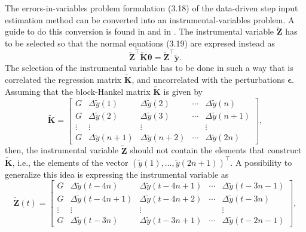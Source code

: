 \documentclass[11pt]{article}
\begin{document}
\begin{itemize}
\begin{itemize}
    The errors-in-variables problem formulation (3.18) of the data-driven step input estimation method can be converted into an instrumental-variables problem.
    A guide to do this conversion is found in \cite{Soderstrom18} and in \cite{Pintelon12Book}. 
    The instrumental variable $\widetilde{\mathbf{Z}}$ has to be selected so that the normal equations (3.19) are expresed instead as
    \begin{equation} \tag{4.22} \widetilde{\mathbf{Z}}^\top \widetilde{\mathbf{K}} \bm{\theta} = \widetilde{\mathbf{Z}}^\top \widetilde{\mathbf{y}} . \label{eqn:neq_siv} \end{equation}
    The selection of the instrumental variable has to be done in such a way that is correlated the regression matrix $\widetilde{\mathbf{K}}$, and uncorrelated with the perturbations $\bm{\epsilon}$.
    Assuming that the block-Hankel matrix $\widetilde{\mathbf{K}}$ is given by
    \begin{equation} \tag{4.23} \widetilde{\mathbf{K}} = \begin{bmatrix} G & \Delta \widetilde{y}(1) & \Delta \widetilde{y}(2) & \cdots & \Delta \widetilde{y}(n) \\ G & \Delta \widetilde{y}(2) & \Delta \widetilde{y}(3) & \cdots & \Delta \widetilde{y}(n+1) \\ \vdots & \vdots & \vdots & & \vdots \\ G & \Delta \widetilde{y}(n+1) & \Delta \widetilde{y}(n+2) & \cdots & \Delta \widetilde{y}(2n) \end{bmatrix} , \label{eqn:matrixK_r} \end{equation}
    then, the instrumental variable $\widetilde{\mathbf{Z}}$ should not contain the elements that construct $\widetilde{\mathbf{K}}$, i.e., the elements of the vector $\left( \widetilde{y}(1), \ldots, \widetilde{y}(2n+1) \right)^\top$.
    A possibility to generalize this idea is expressing the instrumental variable as
    \begin{equation} \tag{4.24} \widetilde{\mathbf{Z}}(t) = \begin{bmatrix} G & \Delta \widetilde{y}(t-4n) & \Delta \widetilde{y}(t-4n+1) & \cdots & \Delta \widetilde{y}(t-3n-1) \\ G & \Delta \widetilde{y}(t-4n+1) & \Delta \widetilde{y}(t-4n+2) & \cdots & \Delta \widetilde{y}(t-3n) \\ \vdots & \vdots & \vdots & & \vdots \\ G & \Delta \widetilde{y}(t-3n) & \Delta \widetilde{y}(t-3n+1) & \cdots & \Delta \widetilde{y}(t-2n-1) \end{bmatrix} , \label{eqn:matrixZ_t} \end{equation}

\end{itemize}
\end{itemize}
\end{document}
